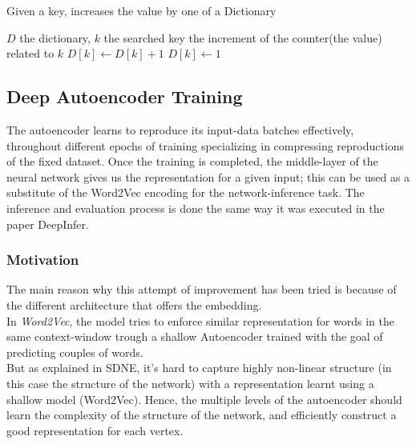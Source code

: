 \documentclass{article}
\begin{document}
			\begin{algorithm}[H] %
				\caption{Given a key, increases the value by one of a Dictionary} %
				\label{alg2} %
				\begin{algorithmic} %
					\REQUIRE $D$ the dictionary, $k$ the searched key
					\ENSURE the increment of the counter(the value) related to $k$
						\STATE $D[k] \gets D[k]+1$
					\ELSE
						\STATE $D[k] \gets 1$
					\ENDIF
				\end{algorithmic}
			\end{algorithm}
			
			\subsection{Deep Autoencoder Training}
			The autoencoder learns to reproduce its input-data batches effectively, throughout different epochs of training specializing in compressing reproductions of the fixed dataset. Once the training is completed, the middle-layer of the neural network gives us the representation for a given input; this can be used as a substitute of the Word2Vec encoding for the network-inference task. The inference and evaluation process is done the same way it was executed in the paper DeepInfer.
			
				\subsubsection{Motivation}
				The main reason why this attempt of improvement has been tried is because of the different architecture that offers the embedding.\\
				In \textit{Word2Vec}, the model tries to enforce similar representation for words in the same context-window trough a shallow Autoencoder trained with the goal of predicting couples of words.\\
				But as explained in SDNE, it's hard to capture highly non-linear structure (in this case the structure of the network) with a representation learnt using a shallow model (Word2Vec). Hence, the multiple levels of the autoencoder should learn the complexity of the structure of the network, and efficiently construct a good representation for each vertex.
				
\end{document}
